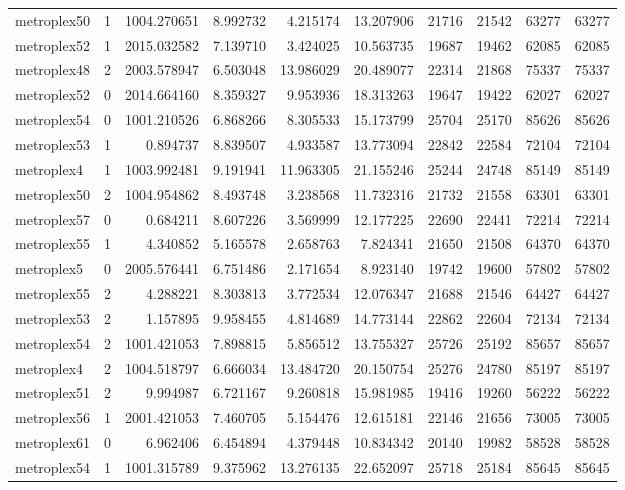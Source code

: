 \begin{longtable}{|l|r|r|r|r|r|r|r|r|r|}
metroplex50 & 1 & 1004.270651 & 8.992732 & 4.215174 & 13.207906 & 21716 & 21542 & 63277 & 63277 \\
metroplex52 & 1 & 2015.032582 & 7.139710 & 3.424025 & 10.563735 & 19687 & 19462 & 62085 & 62085 \\
metroplex48 & 2 & 2003.578947 & 6.503048 & 13.986029 & 20.489077 & 22314 & 21868 & 75337 & 75337 \\
metroplex52 & 0 & 2014.664160 & 8.359327 & 9.953936 & 18.313263 & 19647 & 19422 & 62027 & 62027 \\
metroplex54 & 0 & 1001.210526 & 6.868266 & 8.305533 & 15.173799 & 25704 & 25170 & 85626 & 85626 \\
metroplex53 & 1 & 0.894737 & 8.839507 & 4.933587 & 13.773094 & 22842 & 22584 & 72104 & 72104 \\
metroplex4 & 1 & 1003.992481 & 9.191941 & 11.963305 & 21.155246 & 25244 & 24748 & 85149 & 85149 \\
metroplex50 & 2 & 1004.954862 & 8.493748 & 3.238568 & 11.732316 & 21732 & 21558 & 63301 & 63301 \\
metroplex57 & 0 & 0.684211 & 8.607226 & 3.569999 & 12.177225 & 22690 & 22441 & 72214 & 72214 \\
metroplex55 & 1 & 4.340852 & 5.165578 & 2.658763 & 7.824341 & 21650 & 21508 & 64370 & 64370 \\
metroplex5 & 0 & 2005.576441 & 6.751486 & 2.171654 & 8.923140 & 19742 & 19600 & 57802 & 57802 \\
metroplex55 & 2 & 4.288221 & 8.303813 & 3.772534 & 12.076347 & 21688 & 21546 & 64427 & 64427 \\
metroplex53 & 2 & 1.157895 & 9.958455 & 4.814689 & 14.773144 & 22862 & 22604 & 72134 & 72134 \\
metroplex54 & 2 & 1001.421053 & 7.898815 & 5.856512 & 13.755327 & 25726 & 25192 & 85657 & 85657 \\
metroplex4 & 2 & 1004.518797 & 6.666034 & 13.484720 & 20.150754 & 25276 & 24780 & 85197 & 85197 \\
metroplex51 & 2 & 9.994987 & 6.721167 & 9.260818 & 15.981985 & 19416 & 19260 & 56222 & 56222 \\
metroplex56 & 1 & 2001.421053 & 7.460705 & 5.154476 & 12.615181 & 22146 & 21656 & 73005 & 73005 \\
metroplex61 & 0 & 6.962406 & 6.454894 & 4.379448 & 10.834342 & 20140 & 19982 & 58528 & 58528 \\
metroplex54 & 1 & 1001.315789 & 9.375962 & 13.276135 & 22.652097 & 25718 & 25184 & 85645 & 85645 \\

\end{longtable}

